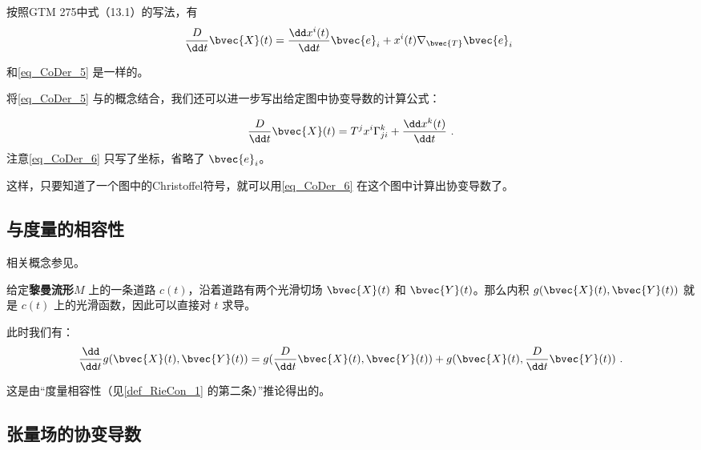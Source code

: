 按照GTM 275中式（13.1）的写法，有
\begin{equation}
\frac{D}{\dd t}\bvec{X}(t)=\frac{\dd x^i(t)}{\dd t}\bvec{e}_i+{x}^i(t)\nabla_{\bvec{T}}\bvec{e}_i~
\end{equation}

和\autoref{eq_CoDer_5} 是一样的。

将\autoref{eq_CoDer_5} 与的概念结合，我们还可以进一步写出给定图中协变导数的计算公式：

\begin{equation}\label{eq_CoDer_6}
\frac{D}{\dd t}\bvec{X}(t)=T^jx^i\Gamma^k_{ji}+\frac{\dd x^k(t)}{\dd t}~.
\end{equation}
注意\autoref{eq_CoDer_6} 只写了坐标，省略了 $\bvec{e}_i$。

这样，只要知道了一个图中的Christoffel符号，就可以用\autoref{eq_CoDer_6} 在这个图中计算出协变导数了。

\subsection{与度量的相容性}

相关概念参见。

\begin{theorem}{}
给定\textbf{黎曼流形}$M$ 上的一条道路 $c(t)$，沿着道路有两个光滑切场 ${\bvec{X}}(t)$ 和 ${\bvec{Y}}(t)$。那么内积 $g({\bvec{X}}(t), {\bvec{Y}}(t))$ 就是 $c(t)$ 上的光滑函数，因此可以直接对 $t$ 求导。

此时我们有：
\begin{equation}
\frac{\dd}{\dd t}g({\bvec{X}}(t), {\bvec{Y}}(t))=g(\frac{D}{\dd t}{\bvec{X}}(t), {\bvec{Y}}(t))+g({\bvec{X}}(t), \frac{D}{\dd t}{\bvec{Y}}(t))~.
\end{equation}
\end{theorem}



这是由“度量相容性（见\autoref{def_RieCon_1} 的第二条）”推论得出的。

\subsection{张量场的协变导数}
